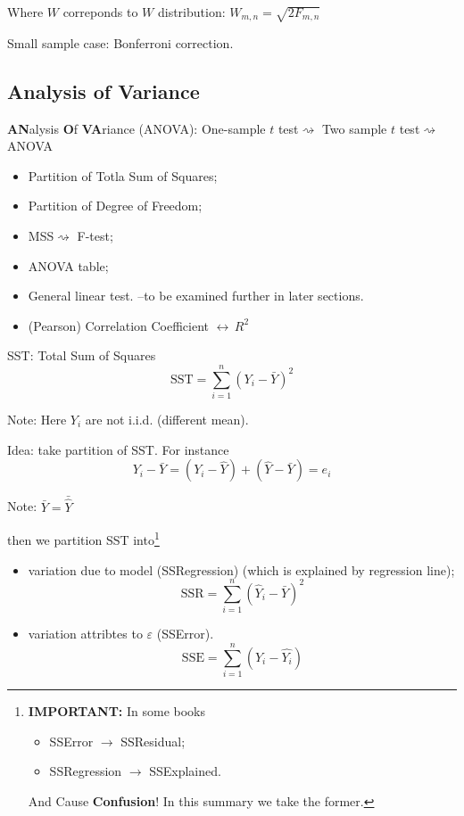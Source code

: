     Where $ W $ correponds to $ W $ distribution: $ W_{m,n}=\sqrt{2F_{m,n}} $
    
    
    
    Small sample case: Bonferroni correction.
    




% 
% 
% 
% 
% 
% 
% 


\subsection{Analysis of Variance}
    \textbf{AN}alysis \textbf{O}f \textbf{VA}riance (ANOVA): One-sample $ t $ test$ \rightsquigarrow $ Two sample $ t $ test$ \rightsquigarrow $ ANOVA
\begin{itemize}[topsep=2pt,itemsep=2pt]
    \item Partition of Totla Sum of Squares;
    \item Partition of Degree of Freedom;
    \item MSS$ \rightsquigarrow $ F-test;
    \item ANOVA table;
    \item General linear test. --to be examined further in later sections.
    \item (Pearson) Correlation Coefficient $ \leftrightarrow \, R^2$
\end{itemize}

    SST: Total Sum of Squares
    \[
        \mathrm{SST}=\sum_{i=1}^n(Y_i-\bar{Y})^2 
    \]
    
    Note: Here $ Y_i $ are not i.i.d. (different mean).

    Idea: take partition of SST. For instance
    \[
        Y_i-\bar{Y}=(Y_i-\hat{Y})+(\hat{Y}-\bar{Y})=e_i 
    \]
    
    Note: $ \bar{Y}=\bar{\hat{Y}} $

    then we partition SST into\footnote{\textbf{IMPORTANT: }In some books \begin{itemize}[topsep=2pt,itemsep=2pt]
        \item SSError $ \to $ SSResidual;
        \item SSRegression $ \to $ SSExplained.
    \end{itemize}

    And Cause \textbf{Confusion}! In this summary we take the former.
         }

         \begin{itemize}[topsep=2pt,itemsep=2pt]
        \item variation due to model (SSRegression) (which is explained by regression line);
        \[
            \mathrm{SSR}= \sum_{i=1}^n(\hat{Y}_i-\bar{Y})^2
        \]
        
        \item variation attribtes to $ \varepsilon  $ (SSError).
        \[
            \mathrm{SSE}= \sum_{i=1}^n(Y_i-\hat{Y_i})
        \]
        
        
    \end{itemize}
    
